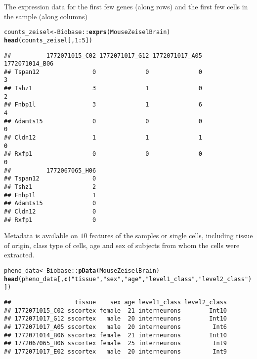 \documentclass[12pt]{article}\usepackage[]{graphicx}\usepackage[usenames,dvipsnames]{color}
\makeatletter
\newcommand{\hlnum}[1]{\textcolor[rgb]{0.686,0.059,0.569}{#1}}%
\newcommand{\hlstr}[1]{\textcolor[rgb]{0.192,0.494,0.8}{#1}}%
\newcommand{\hlopt}[1]{\textcolor[rgb]{0,0,0}{#1}}%
\newcommand{\hlstd}[1]{\textcolor[rgb]{0.345,0.345,0.345}{#1}}%
\newcommand{\hlkwb}[1]{\textcolor[rgb]{0.69,0.353,0.396}{#1}}%
\newcommand{\hlkwd}[1]{\textcolor[rgb]{0.737,0.353,0.396}{\textbf{#1}}}%
\newenvironment{kframe}{%
 \def\at@end@of@kframe{}%
 \ifinner\ifhmode%
  \def\at@end@of@kframe{\end{minipage}}%
  \begin{minipage}{\columnwidth}%
 \fi\fi%
 \def\FrameCommand##1{\hskip\@totalleftmargin \hskip-\fboxsep
 \colorbox{shadecolor}{##1}\hskip-\fboxsep
     \hskip-\linewidth \hskip-\@totalleftmargin \hskip\columnwidth}%
 \MakeFramed {\advance\hsize-\width
   \@totalleftmargin\z@ \linewidth\hsize
   \@setminipage}}%
 {\par\unskip\endMakeFramed%
 \at@end@of@kframe}
\newenvironment{knitrout}{}{} %
\makeatother
\begin{document}
The expression data for the first few genes (along rows) and the first few
cells in the sample (along columns)

\begin{knitrout}
\color{fgcolor}\begin{kframe}
\begin{alltt}
\hlstd{counts_zeisel} \hlkwb{<-} \hlstd{Biobase}\hlopt{::}\hlkwd{exprs}\hlstd{(MouseZeiselBrain)}
\hlkwd{head}\hlstd{(counts_zeisel[,}\hlnum{1}\hlopt{:}\hlnum{5}\hlstd{])}
\end{alltt}
\begin{verbatim}
##          1772071015_C02 1772071017_G12 1772071017_A05 1772071014_B06
## Tspan12               0              0              0              3
## Tshz1                 3              1              0              2
## Fnbp1l                3              1              6              4
## Adamts15              0              0              0              0
## Cldn12                1              1              1              0
## Rxfp1                 0              0              0              0
##          1772067065_H06
## Tspan12               0
## Tshz1                 2
## Fnbp1l                1
## Adamts15              0
## Cldn12                0
## Rxfp1                 0
\end{verbatim}
\end{kframe}
\end{knitrout}


Metadata is available on $10$ features of the samples or single cells,
including tissue of origin, class type of cells, age and sex of subjects from
whom the cells were extracted.

\begin{knitrout}
\color{fgcolor}\begin{kframe}
\begin{alltt}
\hlstd{pheno_data} \hlkwb{<-} \hlstd{Biobase}\hlopt{::}\hlkwd{pData}\hlstd{(MouseZeiselBrain)}
\hlkwd{head}\hlstd{(pheno_data[,}\hlkwd{c}\hlstd{(}\hlstr{"tissue"}\hlstd{,}\hlstr{"sex"}\hlstd{,}\hlstr{"age"}\hlstd{,}\hlstr{"level1_class"}\hlstd{,}\hlstr{"level2_class"}\hlstd{)])}
\end{alltt}
\begin{verbatim}
##                  tissue    sex age level1_class level2_class
## 1772071015_C02 sscortex female  21 interneurons        Int10
## 1772071017_G12 sscortex   male  20 interneurons        Int10
## 1772071017_A05 sscortex   male  20 interneurons         Int6
## 1772071014_B06 sscortex female  21 interneurons        Int10
## 1772067065_H06 sscortex female  25 interneurons         Int9
## 1772071017_E02 sscortex   male  20 interneurons         Int9
\end{verbatim}
\end{kframe}
\end{knitrout}
\end{document}
